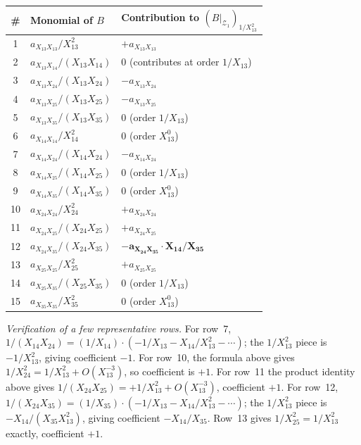 \documentclass[11pt]{article}
\newcommand{\X}[2]{X_{#1#2}}
\newcommand{\Z}{\mathcal{Z}}
\theoremstyle{definition}
\begin{document}
\begin{center}
\renewcommand{\arraystretch}{1.25}
\begin{tabular}{c|l|l}
\toprule
\# & Monomial of $B$ & Contribution to $(B|_{\Z_1})_{1/\X{1}{3}^2}$ \\
\midrule
1 & $a_{\X{1}{3}\X{1}{3}}/\X{1}{3}^2$ & $+a_{\X{1}{3}\X{1}{3}}$ \\
2 & $a_{\X{1}{3}\X{1}{4}}/(\X{1}{3}\X{1}{4})$ & $0$ (contributes at order $1/\X{1}{3}$) \\
3 & $a_{\X{1}{3}\X{2}{4}}/(\X{1}{3}\X{2}{4})$ & $-a_{\X{1}{3}\X{2}{4}}$ \\
4 & $a_{\X{1}{3}\X{2}{5}}/(\X{1}{3}\X{2}{5})$ & $-a_{\X{1}{3}\X{2}{5}}$ \\
5 & $a_{\X{1}{3}\X{3}{5}}/(\X{1}{3}\X{3}{5})$ & $0$ (order $1/\X{1}{3}$) \\
6 & $a_{\X{1}{4}\X{1}{4}}/\X{1}{4}^2$ & $0$ (order $\X{1}{3}^0$) \\
7 & $a_{\X{1}{4}\X{2}{4}}/(\X{1}{4}\X{2}{4})$ & $-a_{\X{1}{4}\X{2}{4}}$ \\
8 & $a_{\X{1}{4}\X{2}{5}}/(\X{1}{4}\X{2}{5})$ & $0$ (order $1/\X{1}{3}$) \\
9 & $a_{\X{1}{4}\X{3}{5}}/(\X{1}{4}\X{3}{5})$ & $0$ (order $\X{1}{3}^0$) \\
10 & $a_{\X{2}{4}\X{2}{4}}/\X{2}{4}^2$ & $+a_{\X{2}{4}\X{2}{4}}$ \\
11 & $a_{\X{2}{4}\X{2}{5}}/(\X{2}{4}\X{2}{5})$ & $+a_{\X{2}{4}\X{2}{5}}$ \\
12 & $a_{\X{2}{4}\X{3}{5}}/(\X{2}{4}\X{3}{5})$ & $\mathbf{-a_{\X{2}{4}\X{3}{5}}\cdot \X{1}{4}/\X{3}{5}}$ \\
13 & $a_{\X{2}{5}\X{2}{5}}/\X{2}{5}^2$ & $+a_{\X{2}{5}\X{2}{5}}$ \\
14 & $a_{\X{2}{5}\X{3}{5}}/(\X{2}{5}\X{3}{5})$ & $0$ (order $1/\X{1}{3}$) \\
15 & $a_{\X{3}{5}\X{3}{5}}/\X{3}{5}^2$ & $0$ (order $\X{1}{3}^0$) \\
\bottomrule
\end{tabular}
\end{center}

\emph{Verification of a few representative rows.} For row~7,
$1/(\X{1}{4}\X{2}{4}) = (1/\X{1}{4})\cdot(-1/\X{1}{3}-\X{1}{4}/\X{1}{3}^2-\cdots)$;
the $1/\X{1}{3}^2$ piece is $-1/\X{1}{3}^2$, giving coefficient $-1$.
For row~10, the formula above gives $1/\X{2}{4}^2=1/\X{1}{3}^2+O(\X{1}{3}^{-3})$,
so coefficient is $+1$. For row~11 the product identity above gives
$1/(\X{2}{4}\X{2}{5})=+1/\X{1}{3}^2+O(\X{1}{3}^{-3})$, coefficient $+1$.
For row~12,
$1/(\X{2}{4}\X{3}{5})=(1/\X{3}{5})\cdot(-1/\X{1}{3}-\X{1}{4}/\X{1}{3}^2-\cdots)$;
the $1/\X{1}{3}^2$ piece is $-\X{1}{4}/(\X{3}{5}\X{1}{3}^2)$, giving
coefficient $-\X{1}{4}/\X{3}{5}$. Row~13 gives $1/\X{2}{5}^2=1/\X{1}{3}^2$
exactly, coefficient $+1$.
\end{document}
